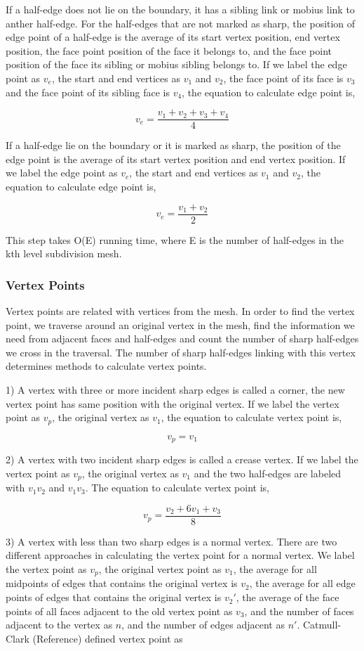\documentclass[12pt]{article}
\begin{document}
If a half-edge does not lie on the boundary, it has a sibling link or mobius link to anther half-edge. For the half-edges that are not marked as sharp, the position of edge point of a half-edge is the average of its start vertex position, end vertex position, the face point position of the face it belongs to, and the face point position of the face its sibling or mobius sibling belongs to. If we label the edge point as $v_e$, the start and end vertices as $v_1$ and $v_2$, the face point of its face is $v_3$ and the face point of its sibling face is $v_4$, the equation to calculate edge point is,

$$v_e = \frac{v_1 + v_2 + v_3 + v_4}{4}$$

If a half-edge lie on the boundary or it is marked as sharp, the position of the edge point is the average of its start vertex position and end vertex position. If we label the edge point as $v_e$, the start and end vertices as $v_1$ and $v_2$, the equation to calculate edge point is,

$$v_e = \frac{v_1 + v_2}{2}$$

This step takes O(E) running time, where E is the number of half-edges in the kth level subdivision mesh.

\subsubsection{Vertex Points}
Vertex points are related with vertices from the mesh. In order to find the vertex point, we traverse around an original vertex in the mesh, find the information we need from adjacent faces and half-edges and count the number of sharp half-edges we cross in the traversal. The number of sharp half-edges linking with this vertex determines methods to calculate vertex points.

1) A vertex with three or more incident sharp edges is called a corner, the new vertex point has same position with the original vertex. If we label the vertex point as $v_p$, the original vertex as $v_1$, the equation to calculate vertex point is,

$$v_p = v_1$$

2) A vertex with two incident sharp edges is called a crease vertex. If we label the vertex point as $v_p$, the original vertex as $v_1$ and the two half-edges are labeled with $v_1v_2$ and $v_1v_3$. The equation to calculate vertex point is,

$$v_p=\frac{v_2 + 6v_1 + v_3}{8}$$

3) A vertex with less than two sharp edges is a normal vertex. There are two different approaches in calculating the vertex point for a normal vertex. We label the vertex point as $v_p$, the original vertex point as $v_1$, the average for all midpoints of edges that contains the original vertex is $v_2$, the average for all edge points of edges that contains the original vertex is $v_2'$, the average of the face points of all faces adjacent to the old vertex point as $v_3$, and the number of faces adjacent to the vertex as $n$, and the number of edges adjacent as $n'$. Catmull-Clark (Reference) defined vertex point as 
\end{document}
